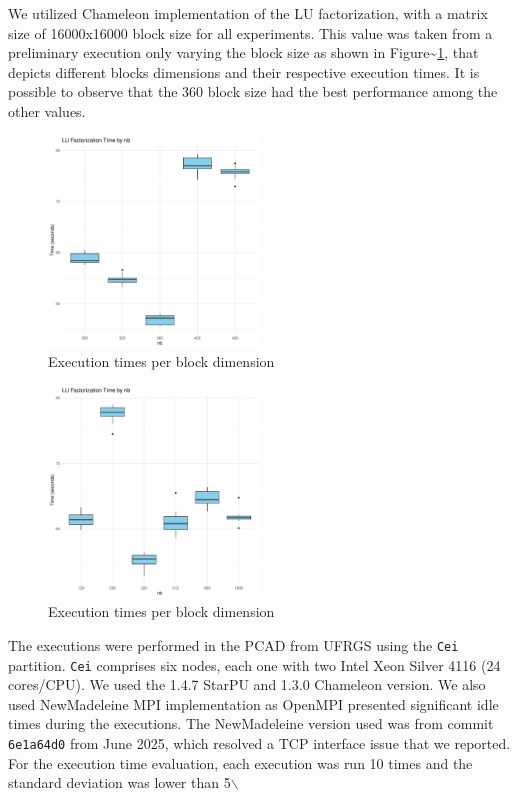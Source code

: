 \documentclass[conference, 10pt, final]{IEEEtran}
\begin{document}
We utilized Chameleon \cite{agullo:inria-00547847} implementation of the LU factorization, with a matrix size of 16000x16000 block size for all experiments. This value was taken from a preliminary execution only varying the block size as shown in Figure\textasciitilde{}\ref{fig:timeBlocks}, that depicts different blocks dimensions and their respective execution times. It is possible to observe that the 360 block size had the best performance among the other values.

\begin{figure}[ht]
\centering
\includegraphics[width=0.5\textwidth]{block-def.pdf}
\caption{Execution times per block dimension}
\label{fig:timeBlocks}
\end{figure}

\begin{figure}[ht]
\centering
\includegraphics[width=0.5\textwidth]{block-size.pdf}
\caption{Execution times per block dimension}
\label{fig:block-size}
\end{figure}


The executions were performed in the PCAD from UFRGS using the \verb|Cei| partition. \verb|Cei| comprises six nodes, each one with two Intel Xeon Silver 4116 (24 cores/CPU). We used the 1.4.7 StarPU and 1.3.0 Chameleon version. We also used NewMadeleine \cite{aumage2007new} MPI implementation as OpenMPI \cite{gabriel2004open} presented significant idle times during the executions. The NewMadeleine version used was from commit \verb|6e1a64d0| from June 2025, which resolved a TCP interface issue that we reported. For the execution time evaluation, each execution was run 10 times and the standard deviation was lower than 5$\backslash$%
\end{document}
